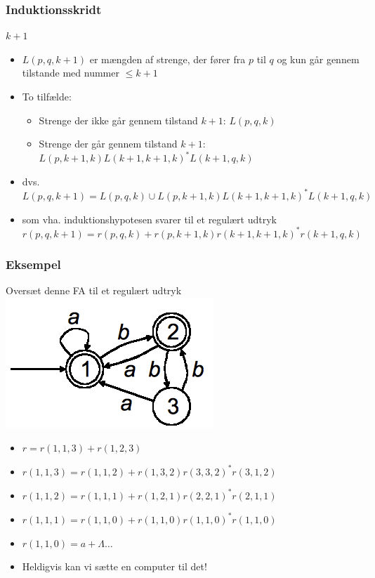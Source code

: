 \begin{frame}
\frametitle{Induktionsskridt}
$k+1$
\begin{itemize}[<+->]
\item $L(p, q, k + 1)$ er mængden af strenge, der fører fra $p$ til $q$ 
og kun går gennem tilstande med nummer $\leq k + 1$
\item
To tilfælde:

\begin{itemize}[<+->]
\item 
  Strenge der ikke går gennem tilstand $k + 1$: $L(p, q, k)$ 
\item Strenge
  der går gennem tilstand $k + 1$: $L(p, k + 1, k) L(k + 1, k + 1, k)^*
  L(k + 1, q, k)$
\end{itemize}
\item dvs. $L(p, q, k + 1) = L(p, q, k) \cup 
			    L(p, k + 1, k) L(k + 1, k + 1, k)^* L(k + 1, q, k)$
\item som vha. induktionshypotesen svarer til et regulært udtryk 
	$r(p, q, k + 1) = r(p, q, k) + 
			    r(p, k + 1, k) r(k + 1, k + 1, k)^* r(k + 1, q, k)$
\end{itemize}
\end{frame}
\begin{frame}
\frametitle{Eksempel}
Oversæt denne FA til et regulært udtryk
\includegraphics[scale=0.4]{images/2_seminar_kleene_2_ex.png}
\begin{itemize}[<+->]
\item $r = r(1,1,3) + r(1,2,3)$
\item $r(1,1,3) = r(1,1,2) + r(1,3,2)r(3,3,2)^*r(3,1,2)$
\item $r(1,1,2) = r(1,1,1) + r(1,2,1)r(2,2,1)^*r(2,1,1)$
\item $r(1,1,1) = r(1,1,0) + r(1,1,0)r(1,1,0)^*r(1,1,0)$
\item $r(1,1,0) = a + \Lambda\ldots$
\item Heldigvis kan vi sætte en computer til det!
\end{itemize}
\end{frame}
